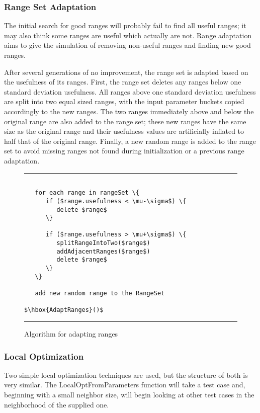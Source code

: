 \documentclass[runningheads]{llncs}
\begin{document}
\FloatBarrier
\subsubsection{Range Set Adaptation}
The initial search for good ranges will probably fail to find all useful ranges; it may also think some ranges are useful which actually are not. Range adaptation aims to give the simulation of removing non-useful ranges and finding new good ranges.

After several generations of no improvement, the range set is adapted based on the usefulness of its ranges. First, the range set deletes any ranges below one standard deviation usefulness. All ranges above one standard deviation usefulness are split into two equal sized ranges, with the input parameter buckets copied accordingly to the new ranges. The two ranges immediately above and below the original range are also added to the range set; these new ranges have the same size as the original range and their usefulness values are artificially inflated to half that of the original range. Finally, a new random range is added to the range set to avoid missing ranges not found during initialization or a previous range adaptation.

\begin{figure}[h!]
\begin{center}
\hrule
\medskip
\begin{Verbatim}[fontfamily=tt, xleftmargin=10pt, commandchars=\\\{\},
   codes={\catcode`$=3\catcode`^=7\catcode`_=8}]
   
   for each range in rangeSet \{
      if ($range.usefulness < \mu-\sigma$) \{
         delete $range$
      \}
      
      if ($range.usefulness > \mu+\sigma$) \{
         splitRangeIntoTwo($range$)
         addAdjacentRanges($range$)
         delete $range$
      \}
   \}   
   
   add new random range to the RangeSet
        
$\hbox{AdaptRanges}()$  
\end{Verbatim}
\hrule
\end{center}
\caption{Algorithm for adapting ranges \label{fig:adptRang}}
\end{figure}

\FloatBarrier
\subsubsection{Local Optimization}
Two simple local optimization techniques are used, but the structure of both is very similar. The LocalOptFromParameters function will take a test case and, beginning with a small neighbor size, will begin looking at other test cases in the neighborhood of the supplied one. 
\end{document}
